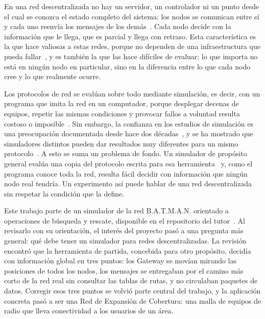 
En una red descentralizada no hay un servidor, un controlador ni un punto desde
el cual se conozca el estado completo del sistema: los nodos se comunican entre
sí y cada uno reenvía los mensajes de los demás~\cite{Corson1999RFC2501,Akyildiz2005Mesh}.
Cada nodo decide con la información que le llega, que es parcial y llega con
retraso. Esta característica es la que hace valiosas a estas redes, porque no
dependen de una infraestructura que pueda fallar~\cite{Reina2015Disaster}, y es
también la que las hace difíciles de evaluar: lo que importa no está en ningún
nodo en particular, sino en la diferencia entre lo que cada nodo cree y lo que
realmente ocurre.

Los protocolos de red se evalúan sobre todo mediante simulación, es decir, con
un programa que imita la red en un computador, porque desplegar decenas de
equipos, repetir las mismas condiciones y provocar fallos a voluntad resulta
costoso o imposible~\cite{Wehrle2010Modeling,Kiess2007RealWorld}. Sin embargo, la
confianza en los estudios de simulación es una preocupación documentada desde
hace dos décadas~\cite{Pawlikowski2002Credibility,Kurkowski2005Incredibles}, y se
ha mostrado que simuladores distintos pueden dar resultados muy diferentes para
un mismo protocolo~\cite{Cavin2002Accuracy}. A esto se suma un problema de fondo.
Un simulador de propósito general evalúa una copia del protocolo escrita para esa
herramienta~\cite{Riley2010ns3,Varga2008Omnetpp} y, como el programa conoce toda
la red, resulta fácil decidir con información que ningún nodo real tendría. Un
experimento así puede hablar de una red descentralizada sin respetar la condición
que la define.

Este trabajo parte de un simulador de la red B.A.T.M.A.N. orientado a operaciones
de búsqueda y rescate, disponible en el repositorio del
tutor~\cite{JofsanchezciSimulador}. Al revisarlo con su orientación, el interés
del proyecto pasó a una pregunta más general: qué debe tener un simulador para
redes descentralizadas. La revisión encontró que la herramienta de partida,
concebida para otro propósito, decidía con información global en tres puntos: los
Gateway se movían mirando las posiciones de todos los nodos, los mensajes se
entregaban por el camino más corto de la red real sin consultar las tablas de
rutas, y no circulaban paquetes de datos. Corregir esos tres puntos se volvió
parte central del trabajo, y la aplicación concreta pasó a ser una Red de
Expansión de Cobertura: una malla de equipos de radio que lleva conectividad a
los usuarios de un área.

